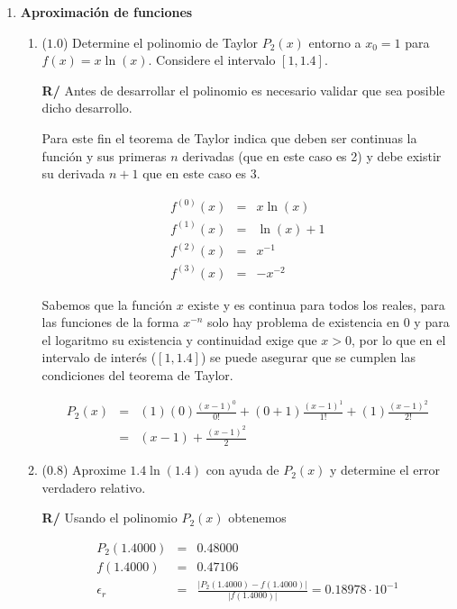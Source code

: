 \documentclass[12pt]{article}
\begin{document}
  \begin{enumerate}[leftmargin=*,widest=9]

    \item \textbf{Aproximación de funciones}

    \begin{enumerate}[label=\alph*]
    \item (\(1.0\)) Determine el polinomio de Taylor \(P_2(x)\) entorno a \(x_0=1\) para \(f(x) = x \ln(x) \). Considere el intervalo \([1, 1.4]\).
    
   
   \textbf{R/} Antes de desarrollar el polinomio es necesario validar que sea posible dicho desarrollo.
   
   Para este fin el teorema de Taylor indica que deben ser continuas la función y sus primeras \(n\) derivadas (que en este caso es 2) y debe existir su derivada \(n+1\) que en este caso es 3.
   
   \begin{eqnarray*}
   f^{(0)}(x) &=& x \ln(x) \\
   f^{(1)}(x) &=& \ln(x) + 1 \\
   f^{(2)}(x) &=& x^{-1} \\
   f^{(3)}(x) &=& -x^{-2}
   \end{eqnarray*}
   
   Sabemos que la función \(x\) existe y es continua para todos los reales, para las funciones de la forma \(x^{-n}\) solo hay problema de existencia en \(0\) y para el logaritmo su existencia y continuidad exige que \(x>0\), por lo que en el intervalo de interés (\([1, 1.4]\)) se puede asegurar que se cumplen las condiciones del teorema de Taylor.

\begin{eqnarray*}
P_2(x) & = & (1)(0) \frac{(x-1)^0}{0!} + (0 + 1) \frac{(x-1)^1}{1!} + (1) \frac{(x-1)^2}{2!} \\
& = & (x - 1) + \frac{(x - 1)^2}{2}
\end{eqnarray*}

    \item (\(0.8\)) Aproxime \(1.4 \ln(1.4)\) con ayuda de \(P_2(x)\) y determine el error verdadero relativo.
    
   \textbf{R/} Usando el polinomio \(P_2(x)\) obtenemos
   
   \begin{eqnarray*}
   P_2(1.4000) & = & 0.48000 \\
   f(1.4000) & = & 0.47106 \\
   \epsilon_r & = & \frac{| P_2(1.4000) - f(1.4000) |}{|f(1.4000)|} = 0.18978 \cdot 10^{-1}
\end{eqnarray*}      
   

\end{enumerate}
\end{enumerate}
\end{document}
